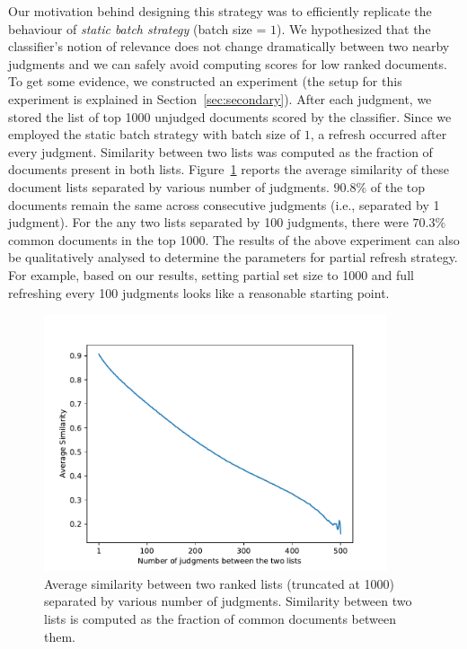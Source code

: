 Our motivation behind designing this strategy was to efficiently replicate the
behaviour of \textit{static batch strategy} (batch size = $1$). We hypothesized
that the classifier's notion of relevance does not change dramatically between
two nearby judgments and we can safely avoid computing scores for low ranked
documents. To get some evidence, we constructed an experiment (the setup for
this experiment is explained in Section~\ref{sec:secondary}). After each judgment, we stored
the list of top 1000 unjudged documents scored by the classifier. Since we
employed the static batch strategy with batch size of $1$, a refresh occurred
after every judgment. Similarity between two lists was computed as the fraction
of documents present in both lists.  Figure~\ref{plot:partial} reports the
average similarity of these document lists separated by various number of
judgments. $90.8\%$ of the top documents remain the same across consecutive
judgments (i.e., separated by 1 judgment). For the any two lists separated by
100 judgments, there were $70.3\%$ common documents in the top 1000.  The
results of the above experiment can also be qualitatively analysed to determine
the parameters for partial refresh strategy. For example, based on our results,
setting partial set size to 1000 and full refreshing every 100 judgments looks
like a reasonable starting point.

\begin{figure}[]
    \centering
\includegraphics[width=0.9\textwidth]{plots/ranklist_similarity.pdf}
\caption{Average similarity between two ranked lists (truncated at 1000)
separated by various number of judgments. Similarity between two lists is
computed as the fraction of common documents between them.}
\label{plot:partial}
\end{figure}



